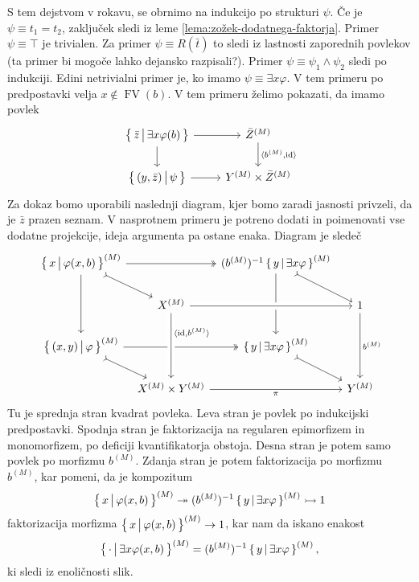 \documentclass[../kategoricna_logika.tex]{subfiles}
\begin{document}
\begin{dokaz}
  S tem dejstvom v rokavu, se obrnimo na indukcijo po strukturi $\psi$.
  Če je $\psi \equiv t_1 = t_2$, zaključek sledi iz leme \ref{lema:zožek-dodatnega-faktorja}. Primer
  $\psi \equiv \top$ je trivialen.  Za primer
  $\psi \equiv R(\bar{t})$ to sledi iz lastnosti zaporednih povlekov
  (ta primer bi mogoče lahko dejansko razpisali?).  Primer
  $\psi \equiv \psi_1 \land \psi_2$ sledi po indukciji.  Edini
  netrivialni primer je, ko imamo $\psi \equiv \exists x \varphi$.  V
  tem primeru po predpostavki velja $x \notin \operatorname{FV}(b)$.
  V tem primeru želimo pokazati, da imamo povlek
  \begin{equation*}
    \begin{tikzcd}
      \setb{\bar{z}}{\exists x \varphi(b)} \ar[d] \ar[r] & \interp{\bar{Z}} \ar[d, "\fprod{b^{(M)}, \mathrm{id}}"] \\
      \setb{(y,\bar{z})}{\psi} \ar[r] & Y^{(M)} \times \bar{Z}^{(M)}
    \end{tikzcd}
  \end{equation*}
  Za dokaz bomo uporabili naslednji diagram, kjer bomo zaradi jasnosti
  privzeli, da je $\bar{z}$ prazen seznam.  V nasprotnem primeru je
  potreno dodati in poimenovati vse dodatne projekcije, ideja
  argumenta pa ostane enaka. Diagram je sledeč
  \begin{equation*}
    \begin{tikzcd}[column sep=tiny]
      \setb{x}{\varphi (x, b)}^{(M)} \ar[dd] \ar[dr, tail] \ar[rr, two heads] & & ( b^{(M)} )^{-1} \setb{y}{\exists x \varphi}^{(M)} \ar[dd] \ar[dr, tail] & \\
      & X^{(M)}  \ar[rr, crossing over] & & 1 \ar[dd, "b^{(M)}"] \\
      \setb{(x,y)}{\varphi}^{(M)} \ar[dr, tail] \ar[rr, two heads] & & \setb{y}{\exists x \varphi}^{(M)} \ar[dr, tail] & \\
      & X^{(M)} \times Y^{(M)} \ar[from=uu, pos=0.3, crossing over,
      "\fprod{\mathrm{id}, b^{(M)}}"] \ar[rr, "\pi"'] & & Y^{(M)}
    \end{tikzcd}
  \end{equation*}
  Tu je sprednja stran kvadrat povleka. Leva stran je povlek po
  indukcijski predpostavki.  Spodnja stran je faktorizacija na
  regularen epimorfizem in monomorfizem, po deficiji kvantifikatorja
  obstoja.  Desna stran je potem samo povlek po morfizmu $b^{(M)}$.
  Zdanja stran je potem faktorizacija po morfizmu $b^{(M)}$, kar
  pomeni, da je kompozitum
  $$\left\lbrace\, x \,\middle|\, \varphi (x, b) \,\right\rbrace^{(M)} \twoheadrightarrow ( b^{(M)} )^{-1} \left\lbrace\, y \,\middle|\, \exists x \varphi \,\right\rbrace^{(M)} \rightarrowtail 1$$
  faktorizacija morfizma $\left\lbrace\, x \,\middle|\, \varphi (x, b) \,\right\rbrace^{(M)} \to 1$, kar
  nam da iskano enakost
  $$\left\lbrace\, \cdot \,\middle|\, \exists x \varphi(x,b) \,\right\rbrace^{(M)} = ( b^{(M)} )^{-1} \left\lbrace\, y \,\middle|\, \exists x \varphi \,\right\rbrace^{(M)},$$
  ki sledi iz enoličnosti slik.
\end{dokaz}
\end{document}
